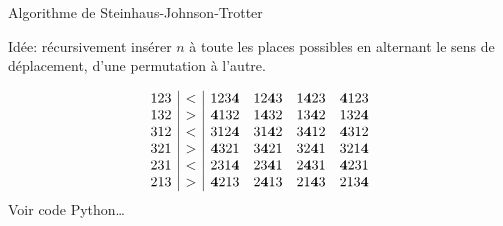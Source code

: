 \documentclass{beamer}
\begin{document}
\begin{frame}{Algorithme de Steinhaus-Johnson-Trotter}

  \begin{NOTE}
    Idée: récursivement insérer $n$ à toute les places possibles en alternant
    le sens de déplacement, d'une permutation à l'autre.
  \end{NOTE}
  \bigskip
  \[\begin{array}{c|c|cccc}
   123 & < & 123{\bf4} & 12{\bf4}3 & 1{\bf4}23 & {\bf4}123 \\
   132 & > & {\bf4}132 & 1{\bf4}32 & 13{\bf4}2 & 132{\bf4} \\
   312 & < & 312{\bf4} & 31{\bf4}2 & 3{\bf4}12 & {\bf4}312 \\
   321 & > & {\bf4}321 & 3{\bf4}21 & 32{\bf4}1 & 321{\bf4} \\
   231 & < & 231{\bf4} & 23{\bf4}1 & 2{\bf4}31 & {\bf4}231 \\
   213 & > & {\bf4}213 & 2{\bf4}13 & 21{\bf4}3 & 213{\bf4} \\
  \end{array}\]
  Voir code Python\dots
\end{frame}
\end{document}
